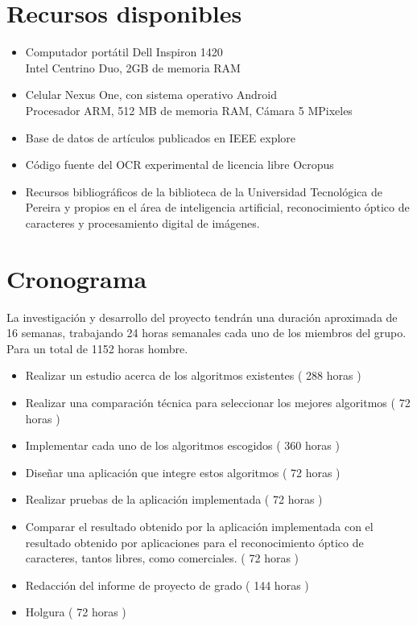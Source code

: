 \documentclass[a4paper, 11pt, oneside]{article}
\begin{document}
	\section{Recursos disponibles}
	\begin{itemize}
		\item Computador portátil Dell Inspiron 1420\\
			Intel Centrino Duo, 2GB de memoria RAM
		\item Celular Nexus One, con sistema operativo Android\\
			Procesador ARM, 512 MB de memoria RAM, Cámara 5 MPixeles
		\item Base de datos de artículos publicados en IEEE explore
		\item Código fuente del OCR experimental de licencia libre Ocropus
	    \item Recursos bibliográficos de la biblioteca de la Universidad Tecnológica de Pereira y propios en el área de inteligencia artificial, reconocimiento óptico de caracteres y procesamiento digital de imágenes.
	\end{itemize}
	\clearpage
	
	\section{Cronograma}
	La investigación y desarrollo del proyecto tendrán una duración aproximada de 16 semanas,
	trabajando 24 horas semanales cada uno de los miembros del grupo. Para un total de 1152
	horas hombre.
	\begin{itemize}
	\item Realizar un estudio acerca de los algoritmos existentes ( 288 horas )
	\item Realizar una comparación técnica para seleccionar los mejores algoritmos ( 72 horas )
	\item Implementar cada uno de los algoritmos escogidos ( 360 horas )
	\item Diseñar una aplicación que integre estos algoritmos ( 72 horas )
	\item Realizar pruebas de la aplicación implementada ( 72 horas )
	\item Comparar el resultado obtenido por la aplicación implementada con el resultado obtenido por aplicaciones para el reconocimiento óptico de caracteres, tantos libres, como comerciales. ( 72 horas )
	\item Redacción del informe de proyecto de grado ( 144 horas )
	\item Holgura ( 72 horas )
	\end{itemize}
	\clearpage
	


\nocite{*}
\end{document}
